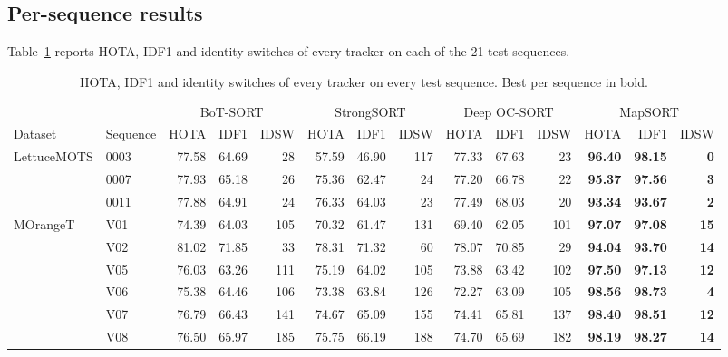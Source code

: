 \documentclass[pdflatex,sn-basic]{sn-jnl}%
\theoremstyle{thmstyleone}%
\begin{document}
\begin{appendices}
\section{Per-sequence results}\label{sec:app-perseq}

Table~\ref{tab:perseq} reports HOTA, IDF1 and identity switches of every tracker on each of the 21 test sequences.

\begin{table}
\caption{HOTA, IDF1 and identity switches of every tracker on every test sequence. Best per sequence in bold.}\label{tab:perseq}
\footnotesize
\setlength{\tabcolsep}{2pt}
\begin{tabular*}{\textheight}{@{\extracolsep\fill}llrrrrrrrrrrrr@{}}
\toprule
 & & \multicolumn{3}{c}{BoT-SORT} & \multicolumn{3}{c}{StrongSORT} & \multicolumn{3}{c}{Deep OC-SORT} & \multicolumn{3}{c}{MapSORT} \\
\cmidrule(lr){3-5}\cmidrule(lr){6-8}\cmidrule(lr){9-11}\cmidrule(lr){12-14}
Dataset & Sequence & HOTA & IDF1 & IDSW & HOTA & IDF1 & IDSW & HOTA & IDF1 & IDSW & HOTA & IDF1 & IDSW \\
\midrule
\multirow{3}{*}{LettuceMOTS} & 0003 & 77.58 & 64.69 & 28 & 57.59 & 46.90 & 117 & 77.33 & 67.63 & 23 & \textbf{96.40} & \textbf{98.15} & \textbf{0} \\
 & 0007 & 77.93 & 65.18 & 26 & 75.36 & 62.47 & 24 & 77.20 & 66.78 & 22 & \textbf{95.37} & \textbf{97.56} & \textbf{3} \\
 & 0011 & 77.88 & 64.91 & 24 & 76.33 & 64.03 & 23 & 77.49 & 68.03 & 20 & \textbf{93.34} & \textbf{93.67} & \textbf{2} \\
\midrule
\multirow{10}{*}{MOrangeT} & V01 & 74.39 & 64.03 & 105 & 70.32 & 61.47 & 131 & 69.40 & 62.05 & 101 & \textbf{97.07} & \textbf{97.08} & \textbf{15} \\
 & V02 & 81.02 & 71.85 & 33 & 78.31 & 71.32 & 60 & 78.07 & 70.85 & 29 & \textbf{94.04} & \textbf{93.70} & \textbf{14} \\
 & V05 & 76.03 & 63.26 & 111 & 75.19 & 64.02 & 105 & 73.88 & 63.42 & 102 & \textbf{97.50} & \textbf{97.13} & \textbf{12} \\
 & V06 & 75.38 & 64.46 & 106 & 73.38 & 63.84 & 126 & 72.27 & 63.09 & 105 & \textbf{98.56} & \textbf{98.73} & \textbf{4} \\
 & V07 & 76.79 & 66.43 & 141 & 74.67 & 65.09 & 155 & 74.41 & 65.81 & 137 & \textbf{98.40} & \textbf{98.51} & \textbf{12} \\
 & V08 & 76.50 & 65.97 & 185 & 75.75 & 66.19 & 188 & 74.70 & 65.69 & 182 & \textbf{98.19} & \textbf{98.27} & \textbf{14} \\

\end{tabular*}
\end{table}
\end{appendices}
\end{document}
